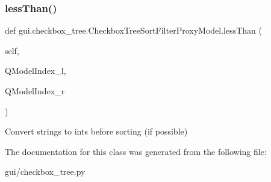 \subsubsection{\texorpdfstring{less\+Than()}{lessThan()}}
{\footnotesize\ttfamily def gui.\+checkbox\+\_\+tree.\+Checkbox\+Tree\+Sort\+Filter\+Proxy\+Model.\+less\+Than (\begin{DoxyParamCaption}\item[{}]{self,  }\item[{}]{Q\+Model\+Index\+\_\+l,  }\item[{}]{Q\+Model\+Index\+\_\+r }\end{DoxyParamCaption})}

\begin{DoxyVerb}Convert strings to ints before sorting (if possible) \end{DoxyVerb}
 

The documentation for this class was generated from the following file\+:\begin{DoxyCompactItemize}
\item 
gui/checkbox\+\_\+tree.\+py\end{DoxyCompactItemize}
